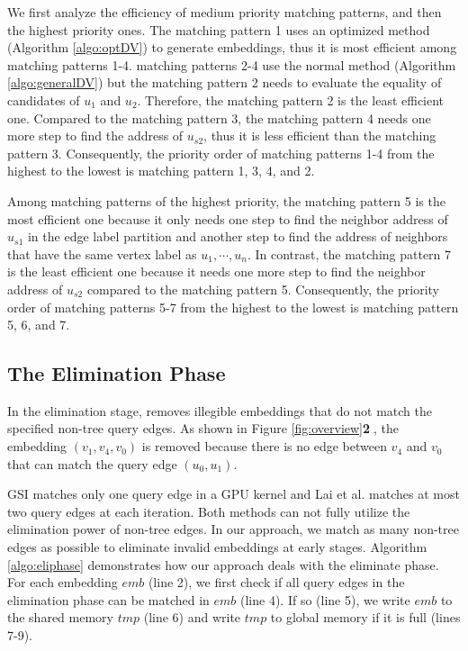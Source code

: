 We first analyze the efficiency of medium priority matching patterns, and then the highest priority ones. The matching pattern 1 uses an optimized method (Algorithm \ref{algo:optDV}) to generate embeddings, thus it is most efficient among matching patterns 1-4. matching patterns 2-4 use the normal method (Algorithm \ref{algo:generalDV}) but the matching pattern 2 needs to evaluate the equality of candidates of $u_1$ and $u_2$. Therefore, the matching pattern 2 is the least efficient one. Compared to the matching pattern 3, the matching pattern 4 needs one more step to find the address of $u_{s2}$, thus it is less efficient than the matching pattern 3. Consequently, the priority order of matching patterns 1-4 from the highest to the lowest is matching pattern 1, 3, 4, and 2.

Among matching patterns of the highest priority, the matching pattern 5 is the most efficient one because it only needs one step to find the neighbor address of $u_{s1}$ in the edge label partition and another step to find the address of neighbors that have the same vertex label as $u_1, \cdots, u_n$. In contrast, the matching pattern 7 is the least efficient one because it needs one more step to find the neighbor address of $u_{s2}$ compared to the matching pattern 5. Consequently, the priority order of matching patterns 5-7 from the highest to the lowest is matching pattern 5, 6, and 7.


\subsection{The Elimination Phase\label{sec:eliphase}}
In the elimination stage, \SystemName removes illegible embeddings that do not match the specified non-tree query edges. As shown in Figure \ref{fig:overview}\textbf{\textcircled{2}}, the embedding $(v_1, v_4, v_0)$ is removed because there is no edge between $v_4$ and $v_0$ that can match the query edge $(u_0, u_1)$.

GSI \cite{zeng2020gsi} matches only one query edge in a GPU kernel and Lai et al. \cite{lai2015scalable} matches at most two query edges at
each iteration. Both methods can not fully utilize the elimination power of non-tree edges. In our approach, we match as many non-tree
edges as possible to eliminate invalid embeddings at early stages. Algorithm \ref{algo:eliphase} demonstrates how our approach deals with
the eliminate phase. For each embedding $emb$ (line 2), we first check if all query edges in the elimination phase can be matched in $emb$
(line 4). If so (line 5), we write $emb$ to the shared memory $tmp$ (line 6) and write $tmp$ to global memory if it is full (lines 7-9).


